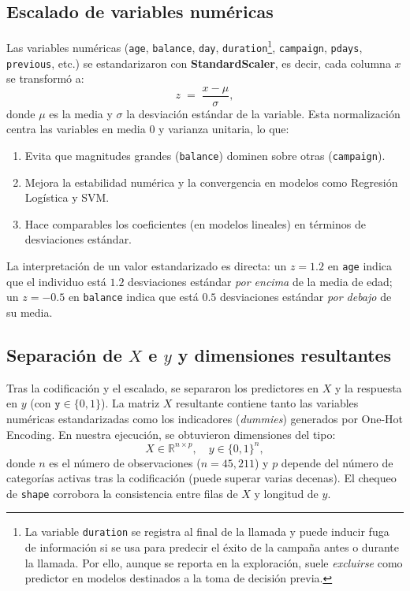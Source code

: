 \documentclass[10pt]{article}
\begin{document}
\subsection*{Escalado de variables numéricas}
Las variables numéricas (\texttt{age}, \texttt{balance}, \texttt{day}, \texttt{duration}\footnote{La variable \texttt{duration} se registra al final de la llamada y puede inducir fuga de información si se usa para predecir el éxito de la campaña antes o durante la llamada. Por ello, aunque se reporta en la exploración, suele \emph{excluirse} como predictor en modelos destinados a la toma de decisión previa.}, \texttt{campaign}, \texttt{pdays}, \texttt{previous}, etc.) se estandarizaron con \textbf{StandardScaler}, es decir, cada columna \(x\) se transformó a:
\[
z \;=\; \frac{x - \mu}{\sigma},
\]
donde \(\mu\) es la media y \(\sigma\) la desviación estándar de la variable. Esta normalización centra las variables en media \(0\) y varianza unitaria, lo que:
\begin{enumerate}
    \item Evita que magnitudes grandes (\texttt{balance}) dominen sobre otras (\texttt{campaign}).
    \item Mejora la estabilidad numérica y la convergencia en modelos como Regresión Logística y SVM.
    \item Hace comparables los coeficientes (en modelos lineales) en términos de desviaciones estándar.
\end{enumerate}
La interpretación de un valor estandarizado es directa: un \(z=1.2\) en \texttt{age} indica que el individuo está \(1.2\) desviaciones estándar \emph{por encima} de la media de edad; un \(z=-0.5\) en \texttt{balance} indica que está \(0.5\) desviaciones estándar \emph{por debajo} de su media.

\subsection*{Separación de \(X\) e \(y\) y dimensiones resultantes}
Tras la codificación y el escalado, se separaron los predictores en \(X\) y la respuesta en \(y\) (con \(\texttt{y}\in\{0,1\}\)). La matriz \(X\) resultante contiene tanto las variables numéricas estandarizadas como los indicadores (\emph{dummies}) generados por One-Hot Encoding. En nuestra ejecución, se obtuvieron dimensiones del tipo:
\[
X \in \mathbb{R}^{n \times p},\quad y \in \{0,1\}^{n},
\]
donde \(n\) es el número de observaciones (\(n=45{,}211\)) y \(p\) depende del número de categorías activas tras la codificación (puede superar varias decenas). El chequeo de \texttt{shape} corrobora la consistencia entre filas de \(X\) y longitud de \(y\).
\end{document}
